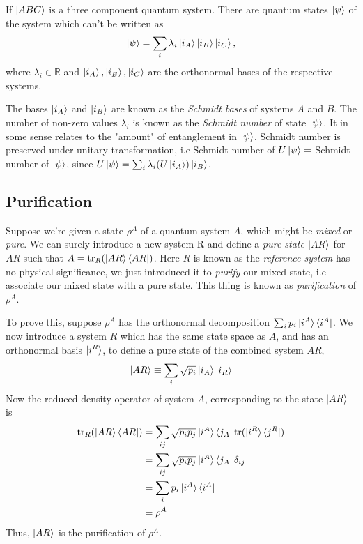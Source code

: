 \begin{remark}
    If $\ket{ABC}$ is a three component quantum system. There are quantum states $\ket{\psi}$ of the system which can't be written as
    \begin{equation}
        \ket{\psi} = \sum_i \lambda_i \ket{i_A}\ket{i_B}\ket{i_C},
    \end{equation}
    where $\lambda_i \in \mathbb{R}$ and $\ket{i_A}, \ket{i_B}, \ket{i_C}$ are the orthonormal bases of the respective systems.
\end{remark}

The bases $\ket{i_A}$ and $\ket{i_B}$ are known as the \textit{Schmidt bases} of systems $A$ and $B$. The number of non-zero values $\lambda_i$ is known as the \textit{Schmidt number} of state $\ket{\psi}$. It in some sense relates to the "amount" of entanglement in $\ket{\psi}$. Schmidt number is preserved under unitary transformation, i.e Schmidt number of $U\ket{\psi} = $ Schmidt number of $\ket{\psi}$, since $U\ket{\psi} = \sum_i \lambda_i (U\ket{i_A})\ket{i_B}$.

\subsection{Purification}
Suppose we're given a state $\rho^A$ of a quantum system $A$, which might be \textit{mixed} or \textit{pure}. We can surely introduce a new system R and define a \textit{pure state $\ket{AR}$} for $AR$ such that $A = \text{tr}_R(\ket{AR}\bra{AR})$. Here $R$ is known as the \textit{reference system} has no physical significance, we just introduced it to \textit{purify} our mixed state, i.e associate our mixed state with a pure state. This thing is known as \textit{purification} of $\rho^A$.

To prove this, suppose $\rho^A$ has the orthonormal decomposition $\sum_i p_i \ket{i^A}\bra{i^A}$. We now introduce a system $R$ which has the same state space as $A$, and has an orthonormal basis $\ket{i^R}$, to define a pure state of the combined system $AR$,
\begin{equation}
    \ket{AR} \equiv \sum_i \sqrt{p_i}\ket{i_A}\ket{i_R}
\end{equation}
Now the reduced density operator of system $A$, corresponding to the state $\ket{AR}$ is
\begin{align}
    \text{tr}_R(\ket{AR}\bra{AR}) &= \sum_{ij} \sqrt{p_ip_j} \ket{i^A}\bra{j_A}\text{tr}(\ket{i^R}\bra{j^R}) \\
    &= \sum_{ij} \sqrt{p_ip_j} \ket{i^A}\bra{j_A} \delta_{ij} \\
    &= \sum_i p_i \ket{i^A}\bra{i^A} \\
    &= \rho^A
\end{align}
Thus, $\ket{AR}$ is the purification of $\rho^A$.